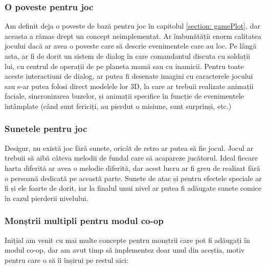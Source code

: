 \documentclass[12pt, a4paper]{article}
\begin{document}
	
	
	\subsubsection{O poveste pentru joc}
	
	Am definit deja o poveste de bază pentru joc în capitolul \ref{section: gamePlot}, dar aceasta a rămas drept un concept neimplementat. Ar îmbunătății enorm calitatea jocului dacă ar avea o poveste care să descrie evenimentele care au loc. Pe lângă asta, ar fi de dorit un sistem de dialog în care comandantul discuta cu soldații lui, cu centrul de operații de pe planeta mamă sau cu inamicii. Pentru toate aceste interactiuni de dialog, ar putea fi desenate imagini cu caracterele jocului sau s-ar putea folosi direct modelele lor 3D, la care ar trebuii realizate animații faciale, sincronizarea buzelor, și animații specifice în funcție de evenimentele întâmplate (când sunt fericiți, au pierdut o misiune, sunt surprinși, etc.)
	
	
	
	
	\subsubsection{Sunetele pentru joc}
	
	Desigur, nu există joc fără sunete, oricât de retro ar putea să fie jocul. Jocul ar trebuii să aibă câteva melodii de fundal care să acapareze jucătorul. Ideal fiecare harta diferită ar avea o melodie diferită, dar acest lucru ar fi greu de realizat fără o persoană dedicată pe această parte. Sunete de atac și pentru efectele speciale ar fi și ele foarte de dorit, iar la finalul unui nivel ar putea fi adăugate sunete comice în cazul pierderii nivelului.
	
	
	
	
	
	\subsubsection{Monștrii multipli pentru modul co-op}
	
	Inițial am venit cu mai multe concepte pentru monștrii care pot fi adăugați în modul co-op, dar am avut timp să implementez doar unul din aceștia, motiv pentru care o să îi înșirui pe restul aici:
	
\end{document}
